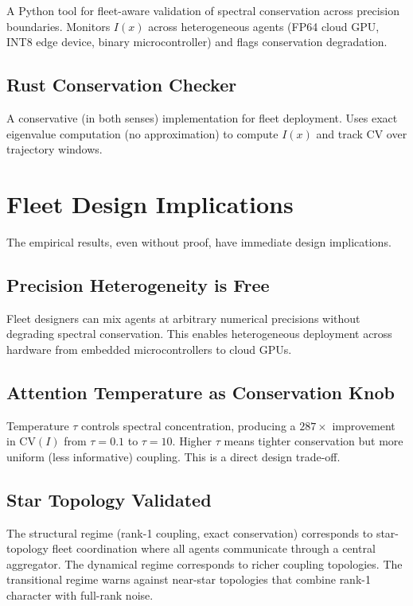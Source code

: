 \documentclass[11pt]{article}
\begin{document}
A Python tool for fleet-aware validation of spectral conservation across precision boundaries. Monitors $I(x)$ across heterogeneous agents (FP64 cloud GPU, INT8 edge device, binary microcontroller) and flags conservation degradation.

\subsection{Rust Conservation Checker}

A conservative (in both senses) implementation for fleet deployment. Uses exact eigenvalue computation (no approximation) to compute $I(x)$ and track CV over trajectory windows.

\section{Fleet Design Implications}

The empirical results, even without proof, have immediate design implications.

\subsection{Precision Heterogeneity is Free}

Fleet designers can mix agents at arbitrary numerical precisions without degrading spectral conservation. This enables heterogeneous deployment across hardware from embedded microcontrollers to cloud GPUs.

\subsection{Attention Temperature as Conservation Knob}

Temperature $\tau$ controls spectral concentration, producing a $287\times$ improvement in $\mathrm{CV}(I)$ from $\tau = 0.1$ to $\tau = 10$. Higher $\tau$ means tighter conservation but more uniform (less informative) coupling. This is a direct design trade-off.

\subsection{Star Topology Validated}

The structural regime (rank-1 coupling, exact conservation) corresponds to star-topology fleet coordination where all agents communicate through a central aggregator. The dynamical regime corresponds to richer coupling topologies. The transitional regime warns against near-star topologies that combine rank-1 character with full-rank noise.
\end{document}
